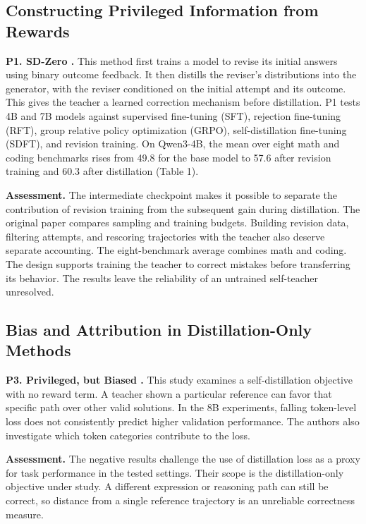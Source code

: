 \documentclass[11pt,a4paper]{article}
\begin{document}
\subsection{Constructing Privileged Information from Rewards}
\textbf{P1. SD-Zero \cite{p1}.} This method first trains a model to revise its initial answers using binary outcome feedback. It then distills the reviser's distributions into the generator, with the reviser conditioned on the initial attempt and its outcome. This gives the teacher a learned correction mechanism before distillation. P1 tests 4B and 7B models against supervised fine-tuning (SFT), rejection fine-tuning (RFT), group relative policy optimization (GRPO), self-distillation fine-tuning (SDFT), and revision training. On Qwen3-4B, the mean over eight math and coding benchmarks rises from 49.8 for the base model to 57.6 after revision training and 60.3 after distillation (Table 1).

\textbf{Assessment.} The intermediate checkpoint makes it possible to separate the contribution of revision training from the subsequent gain during distillation. The original paper compares sampling and training budgets. Building revision data, filtering attempts, and rescoring trajectories with the teacher also deserve separate accounting. The eight-benchmark average combines math and coding. The design supports training the teacher to correct mistakes before transferring its behavior. The results leave the reliability of an untrained self-teacher unresolved.

\subsection{Bias and Attribution in Distillation-Only Methods}
\textbf{P3. Privileged, but Biased \cite{p3}.} This study examines a self-distillation objective with no reward term. A teacher shown a particular reference can favor that specific path over other valid solutions. In the 8B experiments, falling token-level loss does not consistently predict higher validation performance. The authors also investigate which token categories contribute to the loss.

\textbf{Assessment.} The negative results challenge the use of distillation loss as a proxy for task performance in the tested settings. Their scope is the distillation-only objective under study. A different expression or reasoning path can still be correct, so distance from a single reference trajectory is an unreliable correctness measure.
\end{document}
